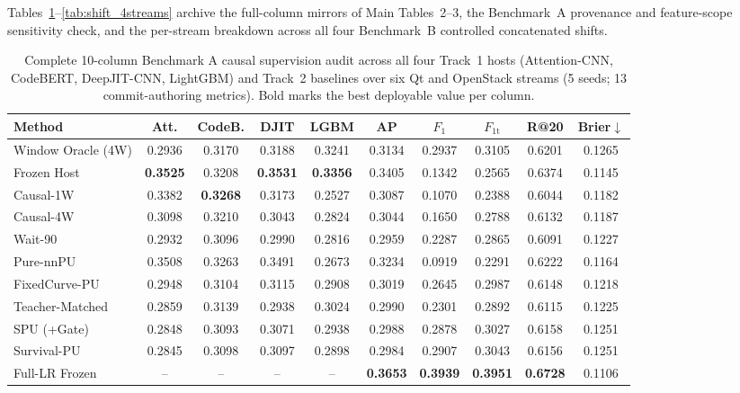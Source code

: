 \documentclass[10pt,a4paper]{article}
\begin{document}
Tables~\ref{tab:or_bench_a_full}--\ref{tab:shift_4streams} archive the full-column mirrors of Main Tables~2--3, the Benchmark~A provenance and feature-scope sensitivity check, and the per-stream breakdown across all four Benchmark~B controlled concatenated shifts.

\begin{table}[!htbp]
\centering
\caption{Complete 10-column Benchmark A causal supervision audit across all four Track~1 hosts (Attention-CNN, CodeBERT, DeepJIT-CNN, LightGBM) and Track~2 baselines over six Qt and OpenStack streams (5 seeds; 13 commit-authoring metrics). Bold marks the best deployable value per column.}
\label{tab:or_bench_a_full}
\fontsize{7.5}{9.0}\selectfont
\setlength{\tabcolsep}{2.2pt}
\begin{tabular*}{\textwidth}{@{\extracolsep\fill}lccccccccc@{}}
\toprule
\textbf{Method} & \textbf{Att.} & \textbf{CodeB.} & \textbf{DJIT} & \textbf{LGBM} & \textbf{AP} & \textbf{$F_1$} & \textbf{$F_{1\mathrm{t}}$} & \textbf{R@20} & \textbf{Brier$\downarrow$} \\
\midrule
Window Oracle (4W) & 0.2936 & 0.3170 & 0.3188 & 0.3241 & 0.3134 & 0.2937 & 0.3105 & 0.6201 & 0.1265 \\
\midrule
Frozen Host & \textbf{0.3525} & 0.3208 & \textbf{0.3531} & \textbf{0.3356} & 0.3405 & 0.1342 & 0.2565 & 0.6374 & 0.1145 \\
Causal-1W & 0.3382 & \textbf{0.3268} & 0.3173 & 0.2527 & 0.3087 & 0.1070 & 0.2388 & 0.6044 & 0.1182 \\
Causal-4W & 0.3098 & 0.3210 & 0.3043 & 0.2824 & 0.3044 & 0.1650 & 0.2788 & 0.6132 & 0.1187 \\
Wait-90 & 0.2932 & 0.3096 & 0.2990 & 0.2816 & 0.2959 & 0.2287 & 0.2865 & 0.6091 & 0.1227 \\
Pure-nnPU & 0.3508 & 0.3263 & 0.3491 & 0.2673 & 0.3234 & 0.0919 & 0.2291 & 0.6222 & 0.1164 \\
FixedCurve-PU & 0.2948 & 0.3104 & 0.3115 & 0.2908 & 0.3019 & 0.2645 & 0.2987 & 0.6148 & 0.1218 \\
Teacher-Matched & 0.2859 & 0.3139 & 0.2938 & 0.3024 & 0.2990 & 0.2301 & 0.2892 & 0.6115 & 0.1225 \\
SPU (+Gate) & 0.2848 & 0.3093 & 0.3071 & 0.2938 & 0.2988 & 0.2878 & 0.3027 & 0.6158 & 0.1251 \\
Survival-PU & 0.2845 & 0.3098 & 0.3097 & 0.2898 & 0.2984 & 0.2907 & 0.3043 & 0.6156 & 0.1251 \\
\midrule
Full-LR Frozen & -- & -- & -- & -- & \textbf{0.3653} & \textbf{0.3939} & \textbf{0.3951} & \textbf{0.6728} & 0.1106 \\

\end{tabular*}
\end{table}
\end{document}

